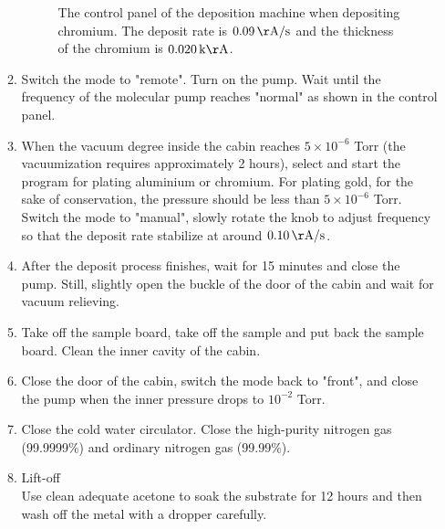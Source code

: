 \documentclass[journal,svgnames,twocolumn,x11names]{IEEEtran}
\begin{document}
\begin{enumerate}
\begin{enumerate}
            \begin{figure}[H]
            	\centering
            	\hspace{0.4in}
            	\caption{The control panel of the deposition machine when depositing chromium. The deposit rate is $0.09\,\mathrm{\AA/s}$ and the thickness of the chromium is $0.020\,\mathrm{k\AA}$.}
                \label{fig:control_panel}
            \end{figure}
            
            \item Switch the mode to "remote". Turn on the pump. Wait until the frequency of the molecular pump reaches "normal" as shown in the control panel.
            \item When the vacuum degree inside the cabin reaches $5\times10^{-6}$ Torr (the vacuumization requires approximately 2 hours), select and start the program for plating aluminium or chromium. For plating gold, for the sake of conservation, the pressure should be less than $5\times10^{-6}$ Torr. Switch the mode to "manual", slowly rotate the knob to adjust frequency so that the deposit rate stabilize at around $0.10\,\mathrm{\AA/s}$.
            \item After the deposit process finishes, wait for 15 minutes and close the pump. Still, slightly open the buckle of the door of the cabin and wait for vacuum relieving.
            \item Take off the sample board, take off the sample and put back the sample board. Clean the inner cavity of the cabin.
            \item Close the door of the cabin, switch the mode back to "front", and close the pump when the inner pressure drops to $10^{-2}$ Torr.
            \item Close the cold water circulator. Close the high-purity nitrogen gas (99.9999\%) and ordinary nitrogen gas (99.99\%).
            \item Lift-off\\
                Use clean adequate acetone to soak the substrate for 12 hours and then wash off the metal with a dropper carefully.
        \end{enumerate}
\end{enumerate}
\end{document}
